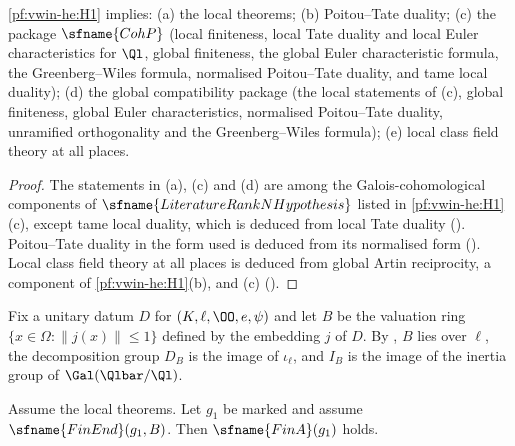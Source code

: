 \begin{lemma}\label{pf:modularity:loc}
\ref{pf:vwin-he:H1} implies: (a) the local theorems; (b) Poitou--Tate duality; (c) the package $\sfname{CohP}$ (local
finiteness, local Tate duality and local Euler characteristics for $\Ql$, global finiteness, the global Euler
characteristic formula, the Greenberg--Wiles formula, normalised Poitou--Tate duality, and tame local duality); (d) the
global compatibility package (the local statements of (c), global finiteness, global Euler characteristics, normalised
Poitou--Tate duality, unramified orthogonality and the Greenberg--Wiles formula); (e) local class field theory at all
places.
\end{lemma}

\begin{proof}
The statements in (a), (c) and (d) are among the Galois-cohomological components of
$\sfname{LiteratureRankNHypothesis}$ listed in \ref{pf:vwin-he:H1}(c), except tame local duality, which is deduced from
local Tate duality (). Poitou--Tate duality in the form used
is deduced from its normalised form (). Local
class field theory at all places is deduced from global Artin reciprocity, a component of \ref{pf:vwin-he:H1}(b), and
(c) ().
\end{proof}

Fix a unitary datum $D$ for $(K,\ell,\OO,e,\psi)$ and let $B$ be the valuation ring
$\{x\in\Omega:\|j(x)\|\le1\}$ defined by the embedding $j$ of $D$. By
, $B$ lies over $\ell$, the decomposition group $D_B$ is the image of
$\iota_\ell$, and $I_B$ is the image of the inertia group of $\Gal(\Qlbar/\Ql)$.

\begin{lemma}\label{pf:modularity:finA}
Assume the local theorems. Let $g_1$ be marked and assume $\sfname{FinEnd}(g_1,B)$. Then $\sfname{FinA}(g_1)$ holds.
\end{lemma}

